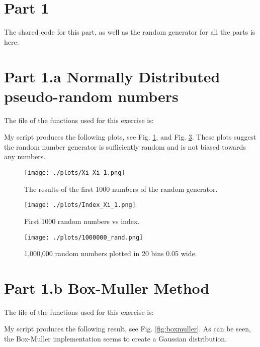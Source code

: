 \section{Part 1}

The shared code for this part, as well as the random generator for all the parts is here:



\section{Part 1.a Normally Distributed pseudo-random numbers}

The file of the functions used for this exercise is:



My script produces the following plots, see Fig. \ref{fig:xi_xi}, and Fig. \ref{fig:million}.
These plots suggest the random number generator is sufficiently random and is not biased towards any numbers.

\begin{figure}[h!]
  \centering
  \texttt{[image: ./plots/Xi\_Xi\_1.png]}
  \caption{The results of the first 1000 numbers of the random generator. }
  \label{fig:xi_xi}
\end{figure}

\begin{figure}[h!]
  \centering
  \texttt{[image: ./plots/Index\_Xi\_1.png]}
  \caption{First 1000 random numbers vs index.}
  \label{fig:thousand}
\end{figure}

\begin{figure}[h!]
  \centering
  \texttt{[image: ./plots/1000000\_rand.png]}
  \caption{1,000,000 random numbers plotted in 20 bins 0.05 wide.}
  \label{fig:million}
\end{figure}


\section{Part 1.b Box-Muller Method}

The file of the functions used for this exercise is:



My script produces the following result, see Fig. \ref{fig:boxmuller}. As can be seen, the Box-Muller implementation seems
to create a Gaussian distribution.


